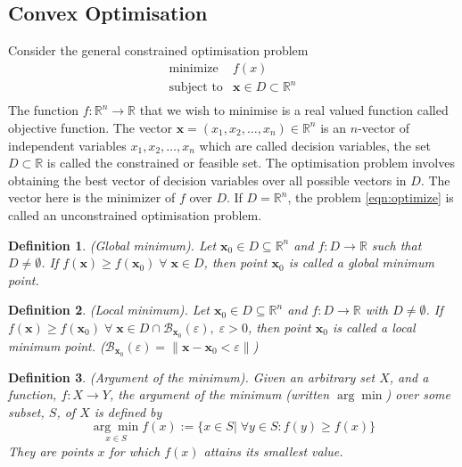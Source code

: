 \documentclass[12pt]{report}
\newtheorem{defn}{Definition}[section]
\numberwithin{equation}{section}
\begin{document}
\subsection{Convex Optimisation}
Consider the general {constrained} optimisation problem 
\begin{equation}\label{eqn:optimize}
\begin{array}{ll}
\text{minimize} & f(x)  \\
\text{subject to} & \bm{x} \in D \subset \mathbb{R}^n \\
\end{array}
\end{equation}
The function $f:\mathbb{R}^n \rightarrow \mathbb{R}$ that we wish to minimise is a real valued function called {objective function}. The vector $\bm{x}=(x_1,x_2,\hdots,x_n)\in \mathbb{R}^n$ is an $n$-vector of independent variables $x_1,x_2,\hdots,x_n$ which are called {decision variables}, the set $D \subset \mathbb{R}$ is called the {constrained or feasible set}. The optimisation problem involves obtaining the best vector of decision variables over all possible vectors in $D$. The vector here is the minimizer of $f$ over $D$. If $D=\mathbb{R}^n$, the problem \eqref{eqn:optimize} is called an {unconstrained} optimisation problem.
\begin{defn} 
\normalfont
(Global minimum).
Let $\bm{x}_0 \in D \subseteq \mathbb{R}^n$ and $f:D \rightarrow \mathbb{R}$ such that $D \neq \emptyset$. If $f(\bm{x}) \geq f(\bm{x}_0) \;  \forall \; \bm{x} \in D$, then point $\bm{x}_0$ is called a global minimum point.
\end{defn}
\begin{defn} 
\normalfont
(Local minimum).
Let $\bm{x}_0 \in D \subseteq \mathbb{R}^n$ and $f:D \rightarrow \mathbb{R}$ with $D \neq \emptyset$. If $f(\bm{x}) \geq f(\bm{x}_0) \;  \forall \; \bm{x} \in D \cap \mathcal{B}_{\bm{x}_0}(\varepsilon),\; \varepsilon>0$, then point $\bm{x}_0$ is called a local minimum point. ($\mathcal{B}_{\bm{x}_0}(\varepsilon) = \| \bm{x}-\bm{x}_0<\varepsilon\|$)
\end{defn}
\begin{defn} 
\normalfont
(Argument of the minimum).
Given an arbitrary set $X$,  and a function, $f\colon X\rightarrow Y$, the argument of the minimum (written $\arg\min$) over some subset, $S$, of $X$ is defined by
\[ \underset{x \in S}{\arg \min } f(x):=\{x \in S | \; \forall y \in S: f(y) \geq f(x)\}
\]
They are points $x$ for which $f(x)$ attains its smallest value. 
\end{defn}
\end{document}
